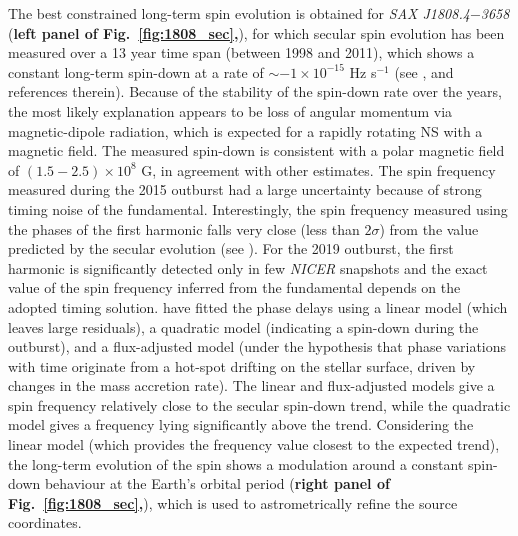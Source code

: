 \documentclass[graybox]{svmult}
\def \saxj{{\em SAX J1808.4$-$3658\xspace}}
\def \nicer{{\em NICER\xspace}}
\begin{document}
The best constrained long-term spin evolution is obtained for \saxj{} (\textbf{left panel of Fig.~\ref{fig:1808_sec},}), for which secular spin evolution has been measured over a 13 year time span (between 1998 and 2011), which shows a constant long-term spin-down at a rate of $\sim -1 \times 10^{-15}$ Hz s$^{-1}$ (see \cite{Patruno2012}, and references therein). Because of the stability of the spin-down rate over the years, the most likely explanation appears to be loss of angular momentum via magnetic-dipole radiation, which is expected for a rapidly rotating NS with a magnetic field. The measured spin-down is consistent with a polar magnetic field of $(1.5 - 2.5) \times 10^8$ G, in agreement with other estimates. The spin frequency measured during the 2015 outburst had a large uncertainty because of strong timing noise of the fundamental. Interestingly, the spin frequency measured using the phases of the first harmonic falls very close (less than $2 \sigma$) from the value predicted by the secular evolution (see \cite{Sanna2017c}). For the 2019 outburst, the first harmonic is significantly detected only in few \nicer{} snapshots and the exact value of the spin frequency inferred from the fundamental depends on the adopted timing solution. \cite{Bult2019c} have fitted the phase delays using a linear model (which leaves large residuals), a quadratic model (indicating a spin-down during the outburst), and a flux-adjusted model (under the hypothesis that phase variations with time originate from a hot-spot drifting on the stellar surface, driven by changes in the mass accretion rate). The linear and flux-adjusted models give a spin frequency relatively close to the secular spin-down trend, while the quadratic model gives a frequency lying significantly above the trend. Considering the linear model (which provides the frequency value closest to the expected trend), the long-term evolution of the spin shows a modulation around a constant spin-down behaviour at the Earth's orbital period (\textbf{right panel of Fig.~\ref{fig:1808_sec},}), which is used to astrometrically refine the source coordinates.
\end{document}
